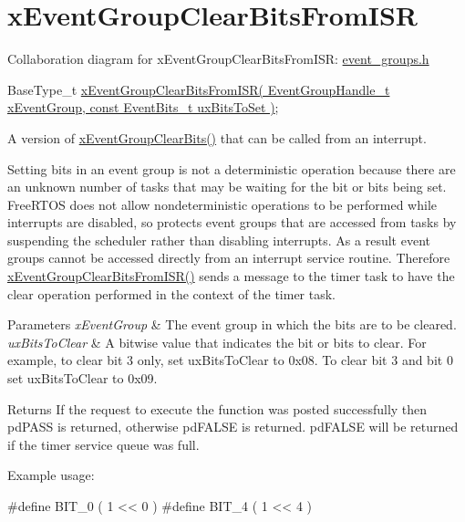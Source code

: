 \hypertarget{group__x_event_group_clear_bits_from_i_s_r}{}\section{x\+Event\+Group\+Clear\+Bits\+From\+I\+SR}
\label{group__x_event_group_clear_bits_from_i_s_r}
Collaboration diagram for x\+Event\+Group\+Clear\+Bits\+From\+I\+SR\+:
\hyperlink{event__groups_8h}{event\+\_\+groups.\+h} 
\begin{DoxyPre}
   BaseType\_t \hyperlink{event__groups_8h_a3d7de214a697f33fe7b914e26a93f33a}{xEventGroupClearBitsFromISR( EventGroupHandle\_t xEventGroup, const EventBits\_t uxBitsToSet )};
\end{DoxyPre}


A version of \hyperlink{event__groups_8h_a0fb72cfdd4f0d5f86d955fc3af448f2a}{x\+Event\+Group\+Clear\+Bits()} that can be called from an interrupt.

Setting bits in an event group is not a deterministic operation because there are an unknown number of tasks that may be waiting for the bit or bits being set. Free\+R\+T\+OS does not allow nondeterministic operations to be performed while interrupts are disabled, so protects event groups that are accessed from tasks by suspending the scheduler rather than disabling interrupts. As a result event groups cannot be accessed directly from an interrupt service routine. Therefore \hyperlink{event__groups_8h_a3d7de214a697f33fe7b914e26a93f33a}{x\+Event\+Group\+Clear\+Bits\+From\+I\+S\+R()} sends a message to the timer task to have the clear operation performed in the context of the timer task.


\begin{DoxyParams}{Parameters}
{\em x\+Event\+Group} & The event group in which the bits are to be cleared.\\
\hline
{\em ux\+Bits\+To\+Clear} & A bitwise value that indicates the bit or bits to clear. For example, to clear bit 3 only, set ux\+Bits\+To\+Clear to 0x08. To clear bit 3 and bit 0 set ux\+Bits\+To\+Clear to 0x09.\\
\hline
\end{DoxyParams}
\begin{DoxyReturn}{Returns}
If the request to execute the function was posted successfully then pd\+P\+A\+SS is returned, otherwise pd\+F\+A\+L\+SE is returned. pd\+F\+A\+L\+SE will be returned if the timer service queue was full.
\end{DoxyReturn}
Example usage\+: 
\begin{DoxyPre}
  #define BIT\_0 ( 1 << 0 )
  #define BIT\_4 ( 1 << 4 )\end{DoxyPre}



